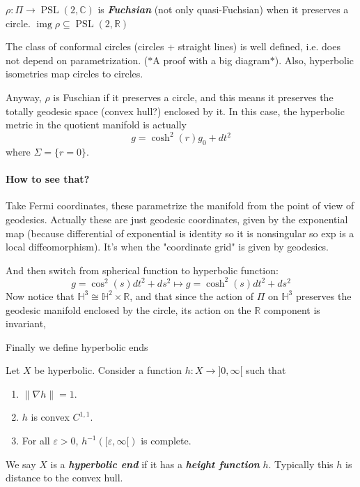  $\rho:\Pi\longrightarrow \operatorname{PSL}(2,\mathbb{C})$ is  \textit{\textbf{Fuchsian}} (not only quasi-Fuchsian) when it preserves a circle.  $\operatorname{img} \rho\subseteq \operatorname{PSL}(2,\mathbb{R})$
 
 \begin{remark}\leavevmode
 	The class of conformal circles (circles + straight lines) is well defined, i.e. does not depend on parametrization. ($*$A proof with a big diagram$*$). Also, hyperbolic isometries map circles to circles.
 \end{remark}

 Anyway, $\rho$ is Fuschian if it preserves a circle, and this means it preserves the totally geodesic space (convex hull?) enclosed by it. In this case, the hyperbolic metric in the quotient manifold is actually
 \[g=\cosh^2(r)g_0+dt^2\]
 where $\Sigma=\{r=0\}$.

 \paragraph{How to see that?}  Take Fermi coordinates, these parametrize the manifold from the point of view of geodesics. Actually these are just geodesic coordinates, given by the exponential map (because differential of exponential is identity so it is nonsingular so exp is a local diffeomorphism). It's when the "coordinate grid" is given by geodesics.

 And then switch from spherical function to hyperbolic function:
 \[g=\cos^2(s)dt^2+ds^2\longmapsto g=\cosh^2(s)dt^2+ds^2 \]
 Now notice that $\mathbb{H}^{3}\cong \mathbb{H}^{2}\times \mathbb{R}$, and that since the action of $\Pi$ on $\mathbb{H}^{3}$ preserves the geodesic manifold enclosed by the circle, its action on the $\mathbb{R}$ component is invariant, 

Finally we define hyperbolic ends

\begin{defn}\leavevmode
	Let $X$ be hyperbolic. Consider a function $h:X\longrightarrow ]0,\infty[$ such that
	\begin{enumerate}
		\item $\|\nabla h\|=1$.
		\item $h$ is convex $C^{1,1}$.
		\item For all $\varepsilon>0$, $h^{-1}([\varepsilon,\infty[)$ is complete.
	\end{enumerate}
	We say $X$ is a \textit{\textbf{hyperbolic end}} if it has a  \textit{\textbf{height function}}  $h$. Typically this $h$ is distance to the convex hull.
\end{defn}

